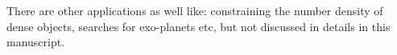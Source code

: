 There are other applications as well like: constraining the number density 
of dense objects, searches
for exo-planets etc, but not discussed in details in this manuscript. 

